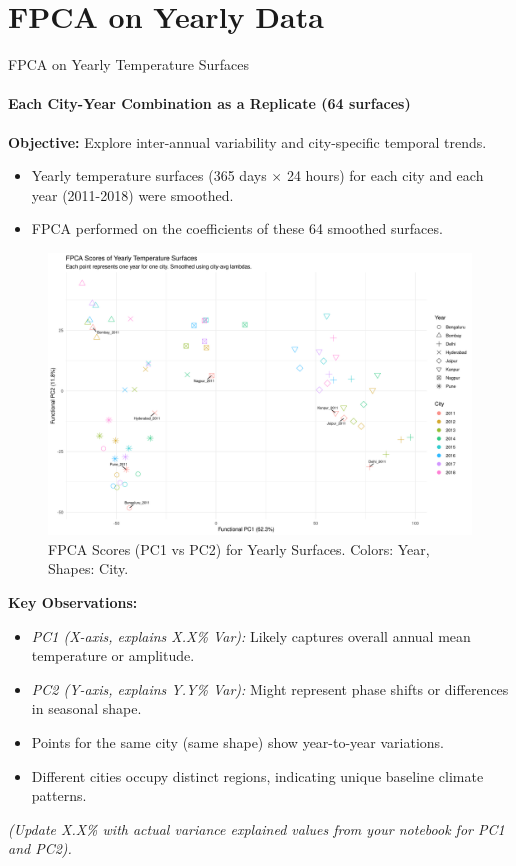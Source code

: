 \documentclass[svgnames, 12pt]{beamer}
\begin{document}
\section{FPCA on Yearly Data}
\begin{frame}{FPCA on Yearly Temperature Surfaces}
  \framesubtitle{Each City-Year Combination as a Replicate (64 surfaces)}
  \textbf{Objective:} Explore inter-annual variability and city-specific temporal trends.
  \begin{itemize}
    \item Yearly temperature surfaces (365 days $\times$ 24 hours) for each city and each year (2011-2018) were smoothed.
    \item FPCA performed on the coefficients of these 64 smoothed surfaces.
  \end{itemize}
  \begin{figure}
    \includegraphics[width=0.9\linewidth]{../data/output/figures/pca_yearly_scores.png}
    \caption{FPCA Scores (PC1 vs PC2) for Yearly Surfaces. Colors: Year, Shapes: City.}
  \end{figure}
  \textbf{Key Observations:}
  \begin{itemize}
    \item \textit{PC1 (X-axis, explains X.X\% Var):} Likely captures overall annual mean temperature or amplitude.
    \item \textit{PC2 (Y-axis, explains Y.Y\% Var):} Might represent phase shifts or differences in seasonal shape.
    \item Points for the same city (same shape) show year-to-year variations.
    \item Different cities occupy distinct regions, indicating unique baseline climate patterns.
  \end{itemize}
  \textit{(Update X.X\% with actual variance explained values from your notebook for PC1 and PC2).}
\end{frame}
\end{document}
